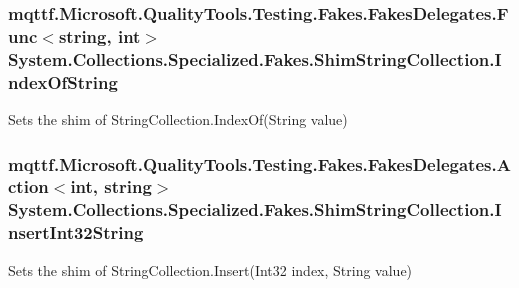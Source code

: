 \hypertarget{class_system_1_1_collections_1_1_specialized_1_1_fakes_1_1_shim_string_collection_a12f9d1da274437351bd30577a03cf347}{
\subsubsection[{Index\-Of\-String}]{\setlength{\rightskip}{0pt plus 5cm}mqttf.\-Microsoft.\-Quality\-Tools.\-Testing.\-Fakes.\-Fakes\-Delegates.\-Func$<$string, int$>$ System.\-Collections.\-Specialized.\-Fakes.\-Shim\-String\-Collection.\-Index\-Of\-String\hspace{0.3cm}{\ttfamily [set]}}}\label{class_system_1_1_collections_1_1_specialized_1_1_fakes_1_1_shim_string_collection_a12f9d1da274437351bd30577a03cf347}


Sets the shim of String\-Collection.\-Index\-Of(\-String value)

\hypertarget{class_system_1_1_collections_1_1_specialized_1_1_fakes_1_1_shim_string_collection_a286b9d37a57e6f75755db9c6126b7f69}{
\subsubsection[{Insert\-Int32\-String}]{\setlength{\rightskip}{0pt plus 5cm}mqttf.\-Microsoft.\-Quality\-Tools.\-Testing.\-Fakes.\-Fakes\-Delegates.\-Action$<$int, string$>$ System.\-Collections.\-Specialized.\-Fakes.\-Shim\-String\-Collection.\-Insert\-Int32\-String\hspace{0.3cm}{\ttfamily [set]}}}\label{class_system_1_1_collections_1_1_specialized_1_1_fakes_1_1_shim_string_collection_a286b9d37a57e6f75755db9c6126b7f69}


Sets the shim of String\-Collection.\-Insert(\-Int32 index, String value)

